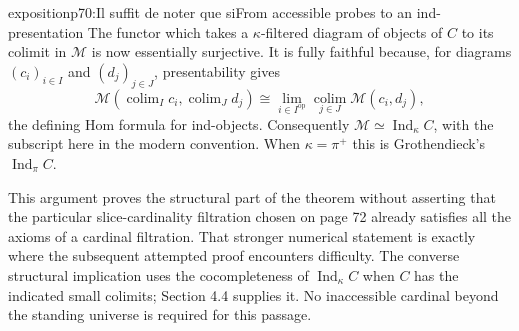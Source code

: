 \begin{dcomment}{exposition}{p70:Il suffit de noter que si}{From accessible probes to an ind-presentation}
The functor which takes a $\kappa$-filtered diagram of objects of $C$ to its colimit in $\mathcal M$ is now essentially surjective.  It is fully faithful because, for diagrams $(c_i)_{i\in I}$ and $(d_j)_{j\in J}$, presentability gives
\[
 \mathcal M(\operatorname{colim}_I c_i,\operatorname{colim}_J d_j)
 \cong\operatorname*{lim}_{i\in I^{\mathrm{op}}}
          \operatorname*{colim}_{j\in J}\mathcal M(c_i,d_j),
\]
the defining Hom formula for ind-objects.  Consequently $\mathcal M\simeq\operatorname{Ind}_\kappa C$, with the subscript here in the modern convention.  When $\kappa=\pi^+$ this is Grothendieck's $\operatorname{Ind}_\pi C$.

This argument proves the structural part of the theorem without asserting that the particular slice-cardinality filtration chosen on page 72 already satisfies all the axioms of a cardinal filtration.  That stronger numerical statement is exactly where the subsequent attempted proof encounters difficulty.  The converse structural implication uses the cocompleteness of $\operatorname{Ind}_\kappa C$ when $C$ has the indicated small colimits; Section 4.4 supplies it.  No inaccessible cardinal beyond the standing universe is required for this passage.
\end{dcomment}

